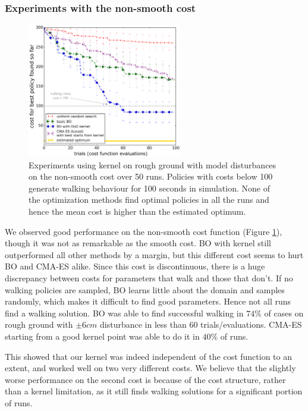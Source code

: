 \subsubsection{Experiments with the non-smooth cost}

\begin{figure}[t]
\centering
\includegraphics[width=0.6\textwidth]{img/rnd_bo_bo_covLoc_cma_rough6_disturb_nonsmooth_cost.png}
\caption{Experiments using \dogkernel kernel on rough ground with model disturbances on the non-smooth cost over 50 runs. Policies with costs below 100 generate walking behaviour for 100 seconds in simulation. None of the optimization methods find optimal policies in all the runs and hence the mean cost is higher than the estimated optimum.}
\label{fig_bo_locomotion_non_smooth}
\end{figure}

We observed good performance on the non-smooth cost function (Figure \ref{fig_bo_locomotion_non_smooth}), though it was not as remarkable as the smooth cost. BO with kernel still outperformed all other methods by a margin, but this different cost seems to hurt BO and \mbox{CMA-ES} alike. Since this cost is discontinuous, there is a huge discrepancy between costs for parameters that walk and those that don't. If no walking policies are sampled, BO learns little about the domain and samples randomly, which makes it difficult to find good parameters. Hence not all runs find a walking solution. BO was able to find successful walking in $74\%$ of cases on rough ground with $\pm 6 cm$ disturbance in less than 60 trials/evaluations. \mbox{CMA-ES} starting from a good kernel point was able to do it in $40\%$ of runs. 

This showed that our kernel was indeed independent of the cost function to an extent, and worked well on two very different costs. We believe that the slightly worse performance on the second cost is because of the cost structure, rather than a kernel limitation, as it still finds walking solutions for a significant portion of runs.  


